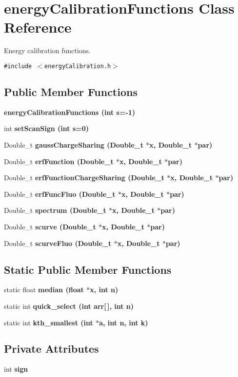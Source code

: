 \section{energy\-Calibration\-Functions Class Reference}
\label{classenergyCalibrationFunctions}
Energy calibration functions.  


{\tt \#include $<$energy\-Calibration.h$>$}

\subsection*{Public Member Functions}
\begin{CompactItemize}
\item 
\bf{energy\-Calibration\-Functions} (int s=-1)
\item 
int \bf{set\-Scan\-Sign} (int s=0)
\item 
Double\_\-t \bf{gauss\-Charge\-Sharing} (Double\_\-t $\ast$x, Double\_\-t $\ast$par)
\item 
Double\_\-t \bf{erf\-Function} (Double\_\-t $\ast$x, Double\_\-t $\ast$par)
\item 
Double\_\-t \bf{erf\-Function\-Charge\-Sharing} (Double\_\-t $\ast$x, Double\_\-t $\ast$par)
\item 
Double\_\-t \bf{erf\-Func\-Fluo} (Double\_\-t $\ast$x, Double\_\-t $\ast$par)
\item 
Double\_\-t \bf{spectrum} (Double\_\-t $\ast$x, Double\_\-t $\ast$par)
\item 
Double\_\-t \bf{scurve} (Double\_\-t $\ast$x, Double\_\-t $\ast$par)
\item 
Double\_\-t \bf{scurve\-Fluo} (Double\_\-t $\ast$x, Double\_\-t $\ast$par)
\end{CompactItemize}
\subsection*{Static Public Member Functions}
\begin{CompactItemize}
\item 
static float \bf{median} (float $\ast$x, int n)
\item 
static int \bf{quick\_\-select} (int arr[$\,$], int n)
\item 
static int \bf{kth\_\-smallest} (int $\ast$a, int n, int k)
\end{CompactItemize}
\subsection*{Private Attributes}
\begin{CompactItemize}
\item 
int \bf{sign}
\end{CompactItemize}


